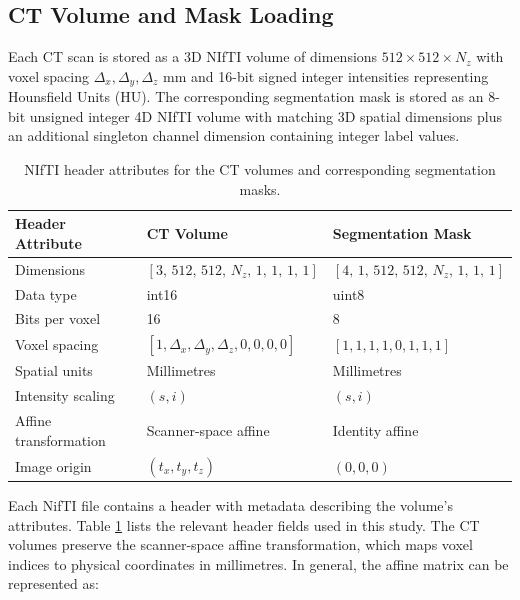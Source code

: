 \subsection{CT Volume and Mask Loading}

Each CT scan is stored as a 3D NIfTI volume of dimensions $ 512 \times 512 \times N_z$ with voxel spacing
$\Delta_x, \Delta_y, \Delta_z$ mm and 16-bit signed integer intensities representing Hounsfield Units (HU).
The corresponding segmentation mask is stored as an 8-bit unsigned integer 4D NIfTI volume with matching 3D spatial
dimensions plus an additional singleton channel dimension containing integer label values.

\begin{table}
\centering
\caption{NIfTI header attributes for the CT volumes and corresponding segmentation masks.}
\label{tab:nifti-header}
\begin{tabular}{|l|l|l|}
\hline
\textbf{Header Attribute} & \textbf{CT Volume} & \textbf{Segmentation Mask} \\ \hline
Dimensions &
$[3,\,512,\,512,\,N_z,\,1,\,1,\,1,\,1]$ &
$[4,\,1,\,512,\,512,\,N_z,\,1,\,1,\,1]$ \\ \hline

Data type &
int16 &
uint8 \\ \hline

Bits per voxel &
16 &
8 \\ \hline

Voxel spacing &
$[1,\Delta_x,\Delta_y,\Delta_z,0,0,0,0]$ &
$[1,1,1,1,0,1,1,1]$ \\ \hline

Spatial units &
Millimetres &
Millimetres \\ \hline

Intensity scaling &
$(s,i)$ &
$(s,i)$ \\ \hline

Affine transformation &
Scanner-space affine &
Identity affine \\ \hline

Image origin &
$(t_x,t_y,t_z)$ &
$(0,0,0)$ \\ \hline
\end{tabular}
\end{table}

Each NifTI file contains a header with metadata describing the volume's attributes. Table \ref{tab:nifti-header} lists the
relevant header fields used in this study.
The CT volumes preserve the scanner-space affine transformation, which maps voxel indices to physical coordinates in millimetres.
In general, the affine matrix can be represented as:

